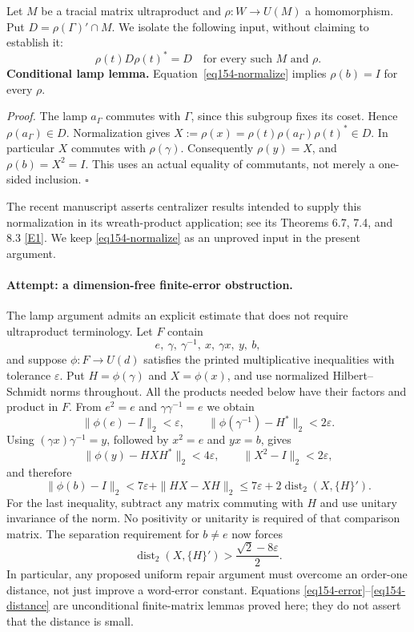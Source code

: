 \documentclass[11pt,a4paper]{article}
\newcommand{\eps}{\varepsilon}
\newcommand{\eref}[2]{\hyperlink{extra:#1:#2}{[E#2]}}
\numberwithin{equation}{section}
\begin{document}
Let $M$ be a tracial matrix ultraproduct and $\rho:W\to U(M)$ a
homomorphism. Put $D=\rho(\Gamma)'\cap M$.
We isolate the following input, without claiming to establish it:
\begin{equation}\label{eq154-normalize}
 \rho(t)D\rho(t)^*=D
 \quad\text{for every such }M\text{ and }\rho.
\end{equation}
\textbf{Conditional lamp lemma.} Equation~\eqref{eq154-normalize} implies
$\rho(b)=I$ for every $\rho$.

\textit{Proof.} The lamp $a_\Gamma$ commutes with $\Gamma$, since this
subgroup fixes its coset. Hence $\rho(a_\Gamma)\in D$. Normalization gives
$X:=\rho(x)=\rho(t)\rho(a_\Gamma)\rho(t)^*\in D$. In particular $X$
commutes with $\rho(\gamma)$. Consequently
$\rho(y)=X$, and $\rho(b)=X^2=I$. This uses an actual equality of
commutants, not merely a one-sided inclusion. \hfill$\square$

The recent manuscript asserts centralizer results intended to supply this
normalization in its wreath-product application; see its Theorems 6.7, 7.4,
and 8.3 \eref{statement}{1}. We keep \eqref{eq154-normalize} as an unproved input
in the present argument.

\paragraph{Attempt: a dimension-free finite-error obstruction.}
The lamp argument admits an explicit estimate that does not require
ultraproduct terminology. Let $F$ contain
\[
 e,\ \gamma,\ \gamma^{-1},\ x,\ \gamma x,\ y,\ b,
\]
and suppose $\phi:F\to U(d)$ satisfies the printed multiplicative
inequalities with tolerance $\eps$. Put $H=\phi(\gamma)$ and
$X=\phi(x)$, and use normalized Hilbert--Schmidt norms throughout.
All the products needed below have their factors and product in $F$.
From $e^2=e$ and $\gamma\gamma^{-1}=e$ we obtain
\[
 \|\phi(e)-I\|_2<\eps,\qquad
 \|\phi(\gamma^{-1})-H^*\|_2<2\eps.
\]
Using $(\gamma x)\gamma^{-1}=y$, followed by $x^2=e$ and $yx=b$, gives
\[
 \|\phi(y)-HXH^*\|_2<4\eps,\qquad
 \|X^2-I\|_2<2\eps,
\]
and therefore
\begin{equation}\label{eq154-error}
 \|\phi(b)-I\|_2
 <7\eps+\|HX-XH\|_2
 \le 7\eps+2\operatorname{dist}_2(X,\{H\}').
\end{equation}
For the last inequality, subtract any matrix commuting with $H$ and use
unitary invariance of the norm. No positivity or unitarity is required of
that comparison matrix. The separation requirement for $b\ne e$ now
forces
\begin{equation}\label{eq154-distance}
 \operatorname{dist}_2(X,\{H\}')>
 \frac{\sqrt2-8\eps}{2}.
\end{equation}
In particular, any proposed uniform repair argument must overcome an
order-one distance, not just improve a word-error constant. Equations
\eqref{eq154-error}--\eqref{eq154-distance} are unconditional finite-matrix
lemmas proved here; they do not assert that the distance is small.
\end{document}

